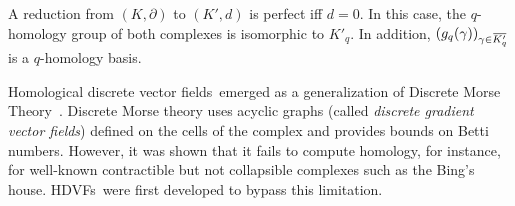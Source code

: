 \documentclass[runningheads]{llncs}
\newcommand{\dr}{\partial}
\newcommand{\ols}[1]{\mskip.5\thinmuskip\overline{\mskip-.5\thinmuskip {#1} \mskip-.5\thinmuskip}\mskip.5\thinmuskip} %
\newcommand{\HCs}{HDVFs}
\newcommand{\Homcs}{Homological discrete vector fields}
\begin{document}

\begin{definition}\label{def:perfect-reduction}
    A reduction from $(K,\dr)$ to $(K',d)$ is perfect iff $d=0$.
    In this case, the $q$-homology group of both complexes is isomorphic to $K'_q$.
    In addition, $(g_q(\gamma))_{\gamma \in \ols{K'_q}}$ is a $q$-homology basis.
\end{definition}

\Homcs\ emerged as a generalization of Discrete Morse Theory~\cite{forman-morse_theory_cell_complex}.
Discrete Morse theory uses acyclic graphs (called \textit{discrete gradient vector fields}) defined on the cells of the complex and provides bounds on Betti numbers. However, it was shown that it fails to compute homology, for instance, for well-known contractible but not collapsible complexes such as the Bing's house. %
\HCs\ were first developed to bypass this limitation.
\end{document}
